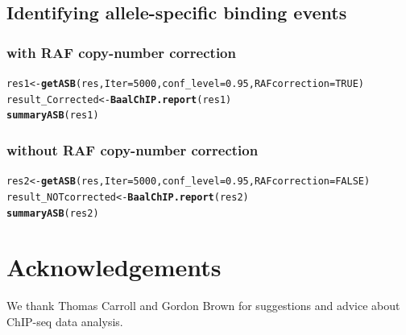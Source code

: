 \documentclass{article}\usepackage[]{graphicx}\usepackage[usenames,dvipsnames]{color}
\makeatletter
\newcommand{\hlnum}[1]{\textcolor[rgb]{0.686,0.059,0.569}{#1}}%
\newcommand{\hlstd}[1]{\textcolor[rgb]{0.345,0.345,0.345}{#1}}%
\newcommand{\hlkwb}[1]{\textcolor[rgb]{0.69,0.353,0.396}{#1}}%
\newcommand{\hlkwc}[1]{\textcolor[rgb]{0.333,0.667,0.333}{#1}}%
\newcommand{\hlkwd}[1]{\textcolor[rgb]{0.737,0.353,0.396}{\textbf{#1}}}%
\newenvironment{kframe}{%
 \def\at@end@of@kframe{}%
 \ifinner\ifhmode%
  \def\at@end@of@kframe{\end{minipage}}%
  \begin{minipage}{\columnwidth}%
 \fi\fi%
 \def\FrameCommand##1{\hskip\@totalleftmargin \hskip-\fboxsep
 \colorbox{shadecolor}{##1}\hskip-\fboxsep
     \hskip-\linewidth \hskip-\@totalleftmargin \hskip\columnwidth}%
 \MakeFramed {\advance\hsize-\width
   \@totalleftmargin\z@ \linewidth\hsize
   \@setminipage}}%
 {\par\unskip\endMakeFramed%
 \at@end@of@kframe}
\newenvironment{knitrout}{}{} %
\makeatother
\begin{document}
\subsection{Identifying allele-specific binding events}

\subsubsection{with RAF copy-number correction}

\begin{knitrout}
\color{fgcolor}\begin{kframe}
\begin{alltt}
\hlstd{res1} \hlkwb{<-} \hlkwd{getASB}\hlstd{(res,} \hlkwc{Iter}\hlstd{=}\hlnum{5000}\hlstd{,} \hlkwc{conf_level}\hlstd{=}\hlnum{0.95}\hlstd{,} \hlkwc{RAFcorrection}\hlstd{=}\hlnum{TRUE}\hlstd{)}
\hlstd{result_Corrected} \hlkwb{<-} \hlkwd{BaalChIP.report}\hlstd{(res1)}
\hlkwd{summaryASB}\hlstd{(res1)}
\end{alltt}
\end{kframe}
\end{knitrout}

\subsubsection{without RAF copy-number correction}

\begin{knitrout}
\color{fgcolor}\begin{kframe}
\begin{alltt}
\hlstd{res2} \hlkwb{<-} \hlkwd{getASB}\hlstd{(res,} \hlkwc{Iter}\hlstd{=}\hlnum{5000}\hlstd{,} \hlkwc{conf_level}\hlstd{=}\hlnum{0.95}\hlstd{,} \hlkwc{RAFcorrection}\hlstd{=}\hlnum{FALSE}\hlstd{)}
\hlstd{result_NOTcorrected} \hlkwb{<-} \hlkwd{BaalChIP.report}\hlstd{(res2)}
\hlkwd{summaryASB}\hlstd{(res2)}
\end{alltt}
\end{kframe}
\end{knitrout}


\section{Acknowledgements}
We thank Thomas Carroll and Gordon Brown for suggestions and advice about ChIP-seq data analysis.
\end{document}
